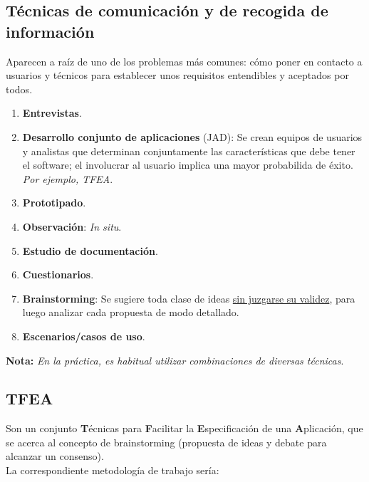 \subsection{Técnicas de comunicación y de recogida de información}

Aparecen a raíz de uno de los problemas más comunes: cómo poner en contacto a usuarios y técnicos para establecer unos requisitos entendibles y aceptados por todos.

\begin{enumerate} %
    \item \textbf{Entrevistas}.
    \item \textbf{Desarrollo conjunto de aplicaciones} (JAD): Se crean equipos de usuarios y analistas que determinan conjuntamente las características que debe tener el software; el involucrar al usuario implica una mayor probabilida de éxito. \textit{Por ejemplo, TFEA}.
    \item \textbf{Prototipado}.
    \item \textbf{Observación}: \textit{In situ}.
    \item \textbf{Estudio de documentación}.
    \item \textbf{Cuestionarios}.
    \item \textbf{Brainstorming}: Se sugiere toda clase de ideas \uline{sin juzgarse su validez}, para luego analizar cada propuesta de modo detallado.
    \item \textbf{Escenarios/casos de uso}.
\end{enumerate}

\textbf{Nota:} \textit{En la práctica, es habitual utilizar combinaciones de diversas técnicas}.

\subsection{TFEA}

Son un conjunto \textbf{T}écnicas para \textbf{F}acilitar la \textbf{E}specificación de una \textbf{A}plicación, que se acerca al concepto de brainstorming (propuesta de ideas y debate para alcanzar un consenso).\\

La correspondiente metodología de trabajo sería:

